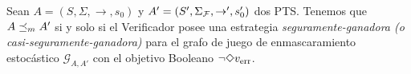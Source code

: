 \begin{theorem} \label{thm:wingame_strat_prob}
  Sean $A= ( S, \Sigma, {\rightarrow}, s_0 )$ y $A'=( S', \Sigma_{\mathcal{F}}, {\rightarrow'}, s_0' )$ dos PTS.
  Tenemos que $A \preceq_{m} A'$ si y solo si el Verificador posee una estrategia \textit{seguramente-ganadora (o casi-seguramente-ganadora)} para el grafo de juego de enmascaramiento estocástico
  $\mathcal{G}_{A,A'}$ con el objetivo Booleano $\neg \Diamond v_{\text{err}}$.
\end{theorem}
\iffalse
\noindent
